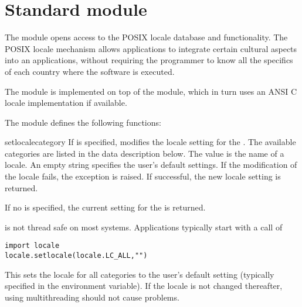 \section{Standard module }

\label{module-locale}

The  module opens access to the POSIX locale database and
functionality. The POSIX locale mechanism allows applications to
integrate certain cultural aspects into an applications, without
requiring the programmer to know all the specifics of each country
where the software is executed.

The  module is implemented on top of the 
module, which in turn uses an ANSI C locale implementation if
available. 

The  module defines the following functions:

\renewcommand{\indexsubitem}{(in module locale)}

\begin{funcdesc}{setlocale}{category}
If  is specified, modifies the locale setting for the
. The available categories are listed in the data
description below. The value is the name of a locale. An empty string
specifies the user's default settings. If the modification of the
locale fails, the exception  is
raised. If successful, the new locale setting is returned.

If no  is specified, the current setting for the
 is returned.

 is not thread safe on most systems. Applications
typically start with a call of
\bcode\begin{verbatim}
import locale
locale.setlocale(locale.LC_ALL,"")
\end{verbatim}\ecode
This sets the locale for all categories to the user's default setting
(typically specified in the  environment variable). If the
locale is not changed thereafter, using multithreading should not
cause problems.
\end{funcdesc}

